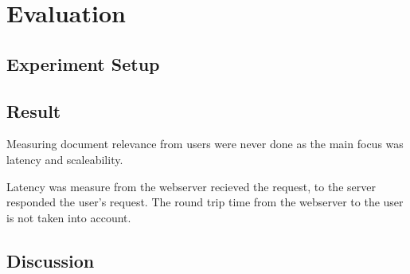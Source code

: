 \chapter{Evaluation}
\label{ch:evaluation}

\section{Experiment Setup}
\section{Result}
Measuring document relevance from users were never done as the main focus was latency and scaleability.

Latency was measure from the webserver recieved the request, to the server responded the user's request.
The round trip time from the webserver to the user is not taken into account.

\section{Discussion}
